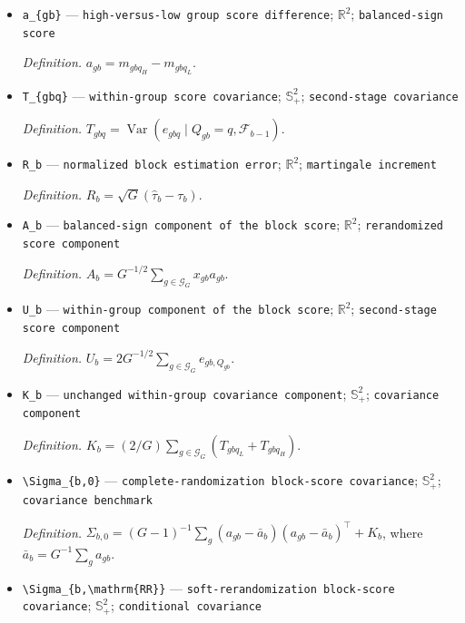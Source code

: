 \documentclass{article}
\begin{document}
\begin{itemize}
  \item \texttt{a\_\allowbreak{}\{gb\}\allowbreak{}} --- \texttt{high-\allowbreak{}versus-\allowbreak{}low group score difference}; \(\mathbb R^2\); \texttt{balanced-\allowbreak{}sign score}
  \par\smallskip\noindent\emph{Definition.} \(a_{gb}=m_{gbq_H}-m_{gbq_L}\).
  \item \texttt{T\_\allowbreak{}\{gbq\}\allowbreak{}} --- \texttt{within-\allowbreak{}group score covariance}; \(\mathbb S_+^2\); \texttt{second-\allowbreak{}stage covariance}
  \par\smallskip\noindent\emph{Definition.} \(T_{gbq}=\operatorname{Var}(e_{gbq}\mid Q_{gb}=q,\mathcal F_{b-1})\).
  \item \texttt{R\_\allowbreak{}b} --- \texttt{normalized block estimation error}; \(\mathbb R^2\); \texttt{martingale increment}
  \par\smallskip\noindent\emph{Definition.} \(R_b=\sqrt G(\widehat\tau_b-\tau_b)\).
  \item \texttt{A\_\allowbreak{}b} --- \texttt{balanced-\allowbreak{}sign component of the block score}; \(\mathbb R^2\); \texttt{rerandomized score component}
  \par\smallskip\noindent\emph{Definition.} \(A_b=G^{-1/2}\sum_{g\in\mathcal G_G}x_{gb}a_{gb}\).
  \item \texttt{U\_\allowbreak{}b} --- \texttt{within-\allowbreak{}group component of the block score}; \(\mathbb R^2\); \texttt{second-\allowbreak{}stage score component}
  \par\smallskip\noindent\emph{Definition.} \(U_b=2G^{-1/2}\sum_{g\in\mathcal G_G}e_{gb,Q_{gb}}\).
  \item \texttt{K\_\allowbreak{}b} --- \texttt{unchanged within-\allowbreak{}group covariance component}; \(\mathbb S_+^2\); \texttt{covariance component}
  \par\smallskip\noindent\emph{Definition.} \(K_b=(2/G)\sum_{g\in\mathcal G_G}(T_{gbq_L}+T_{gbq_H})\).
  \item \texttt{\textbackslash{}\allowbreak{}Sigma\_\allowbreak{}\{b,\allowbreak{}0\}\allowbreak{}} --- \texttt{complete-\allowbreak{}randomization block-\allowbreak{}score covariance}; \(\mathbb S_+^2\); \texttt{covariance benchmark}
  \par\smallskip\noindent\emph{Definition.} \(\Sigma_{b,0}=(G-1)^{-1}\sum_g(a_{gb}-\bar a_b)(a_{gb}-\bar a_b)^\top+K_b\), where \(\bar a_b=G^{-1}\sum_ga_{gb}\).
  \item \texttt{\textbackslash{}\allowbreak{}Sigma\_\allowbreak{}\{b,\allowbreak{}\textbackslash{}\allowbreak{}mathrm\{RR\}\allowbreak{}\}\allowbreak{}} --- \texttt{soft-\allowbreak{}rerandomization block-\allowbreak{}score covariance}; \(\mathbb S_+^2\); \texttt{conditional covariance}

\end{itemize}
\end{document}
